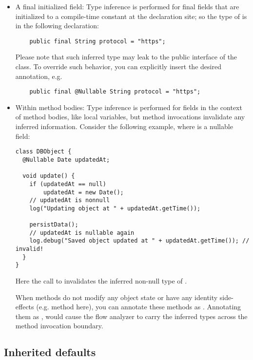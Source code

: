 \begin{itemize}

\item
A final initialized field:
Type inference is performed for final fields that are initialized to a
compile-time constant at the declaration site; so the type of 
is  in the following declaration:

\begin{Verbatim}
    public final String protocol = "https";
\end{Verbatim}

Please note that such inferred type may leak to the public interface of the
class.  To override such behavior, you can explicitly insert the desired
annotation, e.g.

\begin{Verbatim}
    public final @Nullable String protocol = "https";
\end{Verbatim}

\item
Within method bodies:
Type inference is performed for fields in the context of method bodies,
like local variables, but method invocations invalidate any inferred
information.  Consider the following example, where  is a nullable
field:

\begin{Verbatim}
class DBObject {
  @Nullable Date updatedAt;

  void update() {
    if (updatedAt == null)
        updatedAt = new Date();
    // updatedAt is nonnull
    log("Updating object at " + updatedAt.getTime());

    persistData();
    // updatedAt is nullable again
    log.debug("Saved object updated at " + updatedAt.getTime()); // invalid!
  }
}
\end{Verbatim}

Here the call to  invalidates the inferred non-null type
of .

When methods do not modify any object state or have any identity side-effects
(e.g.  method here), you can annotate these methods as
.  Annotating them as , would cause the flow analyzer to
carry the inferred types across the method invocation boundary.

\end{itemize}


\subsection{Inherited defaults}

